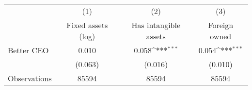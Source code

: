 {
\def\sym#1{\ifmmode^{#1}\else\(^{#1}\)\fi}
\begin{tabular}{l*{3}{c}}
\hline\hline
                    &\multicolumn{1}{c}{(1)}&\multicolumn{1}{c}{(2)}&\multicolumn{1}{c}{(3)}\\
                    &\multicolumn{1}{c}{Fixed assets (log)}&\multicolumn{1}{c}{Has intangible assets}&\multicolumn{1}{c}{Foreign owned}\\
\hline
Better CEO          &       0.010         &       0.058\sym{***}&       0.054\sym{***}\\
                    &     (0.063)         &     (0.016)         &     (0.010)         \\
\hline
Observations        &       85594         &       85594         &       85594         \\
\hline\hline
\end{tabular}
}
